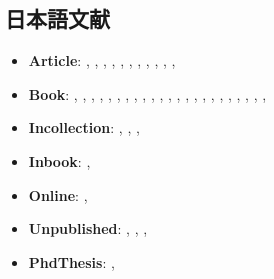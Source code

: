\subsection{日本語文献}

\begin{itemize}
 \item \textbf{Article}:
       \cite{iwamoto91jp:haito-keika},
       \cite{Hattori00},
       \cite{Hattori01},
       \cite{Hattori02},
       \cite{40018847518},
       \cite{40017004376},
       \cite{40020418914},
       \cite{hosoda2017},
       \cite{takeda2017300208},
       \cite{120005614155},
       \cite{120005678435},
 \item \textbf{Book}:
       \cite{somusho04jp:2000io-kaisetsu},
       \cite{imai71:_micr_1},
       \cite{imai72:_micr_2},
       \cite{ito85:_inte_trad},
       \cite{kuroda97jp:keo},
       \cite{miyazawa02:_io_intr},
       \cite{katayama2001},
       \cite{markusen99jp:trade_vol_1},
       \cite{barro97jp},
       \cite{nishimura90:_micr_econ},
       \cite{arimura-takeda2012},
       \cite{arimura2017jp},
       \cite{a.___2000},
       \cite{matloff__2012},
       \cite{Boswell-2012},
       \cite{Ryza2016},
       \cite{ThoughtWorksinc.08},
       \cite{chang-2013},
       \cite{kuriyama20jp},
       \cite{Mori-201206},
       \cite{Uchida-90},
       \cite{Yokomizo-2007},
       \cite{Kuldell2018:_bio},
 \item \textbf{Incollection}:
       \cite{oyama99:_mark_stru},
       \cite{isikawa02jp:_env_trade},
       \cite{takeda12:_cge},
 \item \textbf{Inbook}:
       \cite{kiyono93:_regu_comp_1},
 \item \textbf{Online}:
       \cite{takeda13:jecon},
 \item \textbf{Unpublished}:
       \cite{naikakufu_2011},
       \cite{takeda16jp:_gtap},
       \cite{takeda07jp:cge},
 \item \textbf{PhdThesis}:
       \cite{uzawa-phd-62},
\end{itemize}


\printbibliography[heading=bibintoc]

\printbibliography[title={Articleタイプ},type=article]
\printbibliography[title={Bookタイプ},type=book]
\printbibliography[title={Incollectionタイプ},type=incollection]
\printbibliography[title={Inproceedingsタイプ},type=inproceedings]
\printbibliography[title={Inbookタイプ},type=inbook]
\printbibliography[title={Unpublishedタイプ},type=unpublished]
\printbibliography[title={その他のタイプ},nottype=article,nottype=book,nottype=incollection,nottype=inproceedings,nottype=inbook,nottype=unpublished]
        
